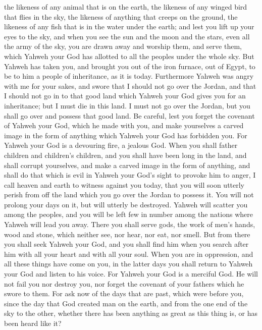 {the likeness of any animal that is on the earth, the likeness of any winged bird that flies in the sky,
the likeness of anything that creeps on the ground, the likeness of any fish that is in the water under the earth;
and lest you lift up your eyes to the sky, and when you see the sun and the moon and the stars, even all the army of the sky, you are drawn away and worship them, and serve them, which Yahweh your God has allotted to all the peoples under the whole sky.
But Yahweh has taken you, and brought you out of the iron furnace, out of Egypt, to be to him a people of inheritance, as it is today.
Furthermore Yahweh was angry with me for your sakes, and swore that I should not go over the Jordan, and that I should not go in to that good land which Yahweh your God gives you for an inheritance;
but I must die in this land. I must not go over the Jordan, but you shall go over and possess that good land.
Be careful, lest you forget the covenant of Yahweh your God, which he made with you, and make yourselves a carved image in the form of anything which Yahweh your God has forbidden you.
For Yahweh your God is a devouring fire, a jealous God.
When you shall father children and children’s children, and you shall have been long in the land, and shall corrupt yourselves, and make a carved image in the form of anything, and shall do that which is evil in Yahweh your God’s sight to provoke him to anger,
I call heaven and earth to witness against you today, that you will soon utterly perish from off the land which you go over the Jordan to possess it. You will not prolong your days on it, but will utterly be destroyed.
Yahweh will scatter you among the peoples, and you will be left few in number among the nations where Yahweh will lead you away.
There you shall serve gods, the work of men’s hands, wood and stone, which neither see, nor hear, nor eat, nor smell.
But from there you shall seek Yahweh your God, and you shall find him when you search after him with all your heart and with all your soul.
When you are in oppression, and all these things have come on you, in the latter days you shall return to Yahweh your God and listen to his voice.
For Yahweh your God is a merciful God. He will not fail you nor destroy you, nor forget the covenant of your fathers which he swore to them.
For ask now of the days that are past, which were before you, since the day that God created man on the earth, and from the one end of the sky to the other, whether there has been anything as great as this thing is, or has been heard like it?
}
